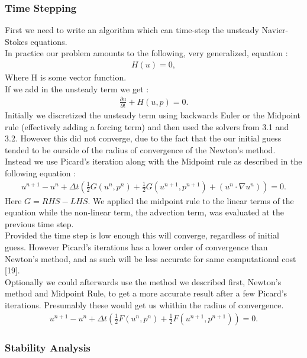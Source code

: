 \documentclass[11pt,twoside,a4paper]{article}
\begin{document}
\subsubsection{Time Stepping}
First we need to write an algorithm which can time-step the unsteady Navier-Stokes equations.\\
In practice our problem amounts to the following, very generalized, equation :
\begin{align*}
H(u) = 0 ,
\end{align*}
Where H is some vector function.\\
If we add in the unsteady term we get :
\begin{align}
\frac{\partial u}{\partial t} + H(u,p) = 0.
\end{align}
Initially we discretized the unsteady term using backwards Euler or the Midpoint rule (effectively adding a forcing term) and then used the solvers from 3.1 and 3.2. However this did not converge, due to the fact that the our initial guess tended to be ourside of the radius of convergence of the Newton's method.\\
Instead we use Picard's iteration along with the Midpoint rule as described in the following equation :
\begin{align}
u^{n+1} - u^n + \Delta t (\frac{1}{2}G(u^n,p^n) + \frac{1}{2} G(u^{n+1},p^{n+1}) + ( u^n \cdot \nabla u^n) ) = 0 .
\end{align}
Here $G = RHS - LHS $. We applied the midpoint rule to the linear terms of the equation while the non-linear term, the advection term, was evaluated at the previous time step.\\
Provided the time step is low enough this will converge, regardless of initial guess. However Picard's iterations has a lower order of convergence than Newton's method, and as such will be less accurate for same computational cost [19].\\
Optionally we could afterwards use the method we described first, Newton's method and Midpoint Rule, to get a more accurate result after a few Picard's iterations. Presumably these would get us whithin the radius of convergence.
\begin{align}
u^{n+1} - u^n + \Delta t (\frac{1}{2}F(u^n,p^n) + \frac{1}{2} F(u^{n+1},p^{n+1})) = 0 .
\end{align}

\subsubsection{Stability Analysis}
\end{document}

